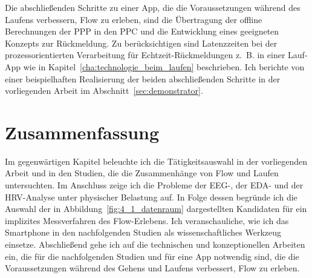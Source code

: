 Die abschließenden Schritte zu einer App, die die Voraussetzungen während des Laufens verbessern, Flow zu erleben, sind die Übertragung der offline Berechnungen der \ac{PPP} in den \ac{PPC} und die Entwicklung eines geeigneten Konzepts zur Rückmeldung. Zu berücksichtigen sind Latenzzeiten bei der prozessorientierten Verarbeitung für Echtzeit-Rückmeldungen z.~B. in einer Lauf-App wie in Kapitel~\ref{cha:technologie_beim_laufen} beschrieben. Ich berichte von einer beispielhaften Realisierung der beiden abschließenden Schritte in der vorliegenden Arbeit im Abschnitt~\ref{sec:demonstrator}.

\section{Zusammenfassung}
\label{sec:zusammenfassung_4}
Im gegenwärtigen Kapitel beleuchte ich die Tätigkeitsauswahl in der vorliegenden Arbeit und in den Studien, die die Zusammenhänge von Flow und Laufen untersuchten. Im Anschluss zeige ich die Probleme der \ac{EEG}-, der \ac{EDA}- und der \ac{HRV}-Analyse unter physischer Belastung auf. In Folge dessen begründe ich die Auswahl der in Abbildung~\ref{fig:4_1_datenraum} dargestellten Kandidaten für ein implizites Messverfahren des Flow-Erlebens. Ich veranschauliche, wie ich das Smartphone in den nachfolgenden Studien als wissenschaftliches Werkzeug einsetze. Abschließend gehe ich auf die technischen und konzeptionellen Arbeiten ein, die für die nachfolgenden Studien und für eine App notwendig sind, die die Voraussetzungen während des Gehens und Laufens verbessert, Flow zu erleben.